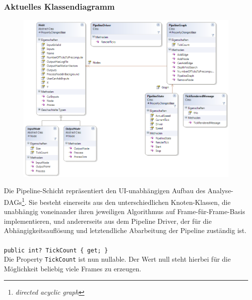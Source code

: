 \subsubsection*{Aktuelles Klassendiagramm}
\begin{figure}[h!]
\begin{center}
\includegraphics[width=\textwidth]{classdiagram/pipe.png}
\end{center}
\end{figure}
Die Pipeline-Schicht repräsentiert den UI-unabhängigen Aufbau des Analyse-DAGs\footnote{\emph{directed acyclic graph}}. Sie besteht einerseits aus den unterschiedlichen Knoten-Klassen, die unabhängig voneinander ihren jeweiligen Algorithmus auf Frame-für-Frame-Basis implementieren, und andererseits aus dem Pipeline Driver, der für die Abhängigkeitsauflösung und letztendliche Abarbeitung der Pipeline zuständig ist.
\newpage

\paragraph{}
\begin{itemize}
	\change \verb!public int? TickCount { get; }! \\
	Die Property \verb!TickCount! ist nun nullable. Der Wert null steht hierbei für die Möglichkeit beliebig viele Frames zu erzeugen.
\end{itemize}

